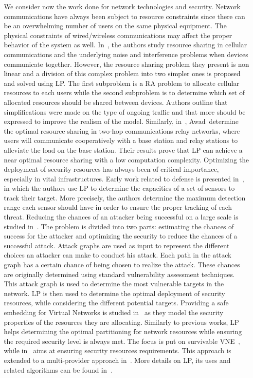 We consider now the work done for network technologies and security. 
Network communications have always been subject to resource constraints since there can be an overwhelming number of users on the same physical equipment. 
The physical constraints of wired/wireless communications may affect the proper behavior of the system as well.
In~\cite{wirelessvirt-moubayed2015}, the authors study resource sharing in cellular communications and the underlying noise and interference problems when devices communicate together.
However, the resource sharing problem they present is non linear and a division of this complex problem into two simpler ones is proposed and solved using LP.
The first subproblem is a RA problem to allocate cellular resources to each users while the second subproblem is to determine which set of allocated resources should be shared between devices.
Authors outline that simplifications were made on the type of ongoing traffic and that more should be expressed to improve the realism of the model.
Similarly, in~\cite{ofdma-awad2008}, Awad~\etal determine the optimal resource sharing in two-hop communications relay networks, where users will communicate cooperatively with a base station and relay stations to alleviate the load on the base station. Their results prove that LP can achieve a near optimal resource sharing with a low computation complexity.
Optimizing the deployment of security resources has always been of critical importance, especially in vital infrastructures.
Early work related to defense is presented in~\cite{monitoring-nash1977}, in which the authors use LP to determine the capacities of a set of sensors to track their target. More precisely, the authors determine the maximum detection range each sensor should have in order to ensure the proper tracking of each threat. 
Reducing the chances of an attacker being successful on a large scale is studied in~\cite{Almohri2016}. The problem is divided into two parts: estimating the chances of success for the attacker and optimizing the security to reduce the chances of a successful attack.
Attack graphs are used as input to represent the different choices an attacker can make to conduct his attack. Each path in the attack graph has a certain chance of being chosen to realize the attack. These chances are originally determined using standard vulnerability assessment techniques.
This attack graph is used to determine the most vulnerable targets in the network.
LP is then used to determine the optimal deployment of security resources, while considering the different potential targets.
Providing a safe embedding for Virtual Networks is studied in~\cite{Chowdhury2016d,safevne-bays2012,Boutigny2018} as they model the security properties of the resources they are allocating. Similarly to previous works, LP helps determining the optimal partitioning for network resources while ensuring the required security level is always met.
The focus is put on survivable VNE~\cite{Chowdhury2016d}, while in~\cite{safevne-bays2012} aims at ensuring security resources requirements. This approach is extended to a multi-provider approach in~\cite{Boutigny2018}.
More details on LP, its uses and related algorithms can be found in~\cite{book-LP}.
